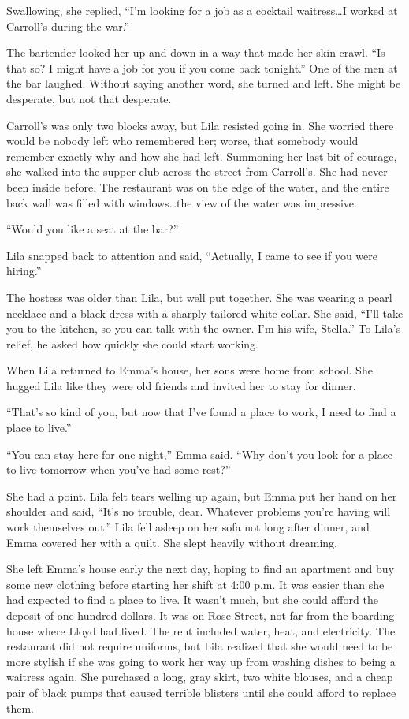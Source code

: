\documentclass[
  letterpaper,
]{book}
\begin{document}
Swallowing, she replied, ``I'm looking for a job as a cocktail
waitress\ldots I worked at Carroll's during the war.''

The bartender looked her up and down in a way that made her skin crawl.
``Is that so? I might have a job for you if you come back tonight.'' One
of the men at the bar laughed. Without saying another word, she turned
and left. She might be desperate, but not that desperate.

Carroll's was only two blocks away, but Lila resisted going in. She
worried there would be nobody left who remembered her; worse, that
somebody would remember exactly why and how she had left. Summoning her
last bit of courage, she walked into the supper club across the street
from Carroll's. She had never been inside before. The restaurant was on
the edge of the water, and the entire back wall was filled with
windows\ldots the view of the water was impressive.

``Would you like a seat at the bar?''

Lila snapped back to attention and said, ``Actually, I came to see if
you were hiring.''

The hostess was older than Lila, but well put together. She was wearing
a pearl necklace and a black dress with a sharply tailored white collar.
She said, ``I'll take you to the kitchen, so you can talk with the
owner. I'm his wife, Stella.'' To Lila's relief, he asked how quickly
she could start working.

When Lila returned to Emma's house, her sons were home from school. She
hugged Lila like they were old friends and invited her to stay for
dinner.

``That's so kind of you, but now that I've found a place to work, I need
to find a place to live.''

``You can stay here for one night,'' Emma said. ``Why don't you look for
a place to live tomorrow when you've had some rest?''

She had a point. Lila felt tears welling up again, but Emma put her hand
on her shoulder and said, ``It's no trouble, dear. Whatever problems
you're having will work themselves out.'' Lila fell asleep on her sofa
not long after dinner, and Emma covered her with a quilt. She slept
heavily without dreaming.

She left Emma's house early the next day, hoping to find an apartment
and buy some new clothing before starting her shift at 4:00 p.m. It was
easier than she had expected to find a place to live. It wasn't much,
but she could afford the deposit of one hundred dollars. It was on Rose
Street, not far from the boarding house where Lloyd had lived. The rent
included water, heat, and electricity. The restaurant did not require
uniforms, but Lila realized that she would need to be more stylish if
she was going to work her way up from washing dishes to being a waitress
again. She purchased a long, gray skirt, two white blouses, and a cheap
pair of black pumps that caused terrible blisters until she could afford
to replace them.
\end{document}

